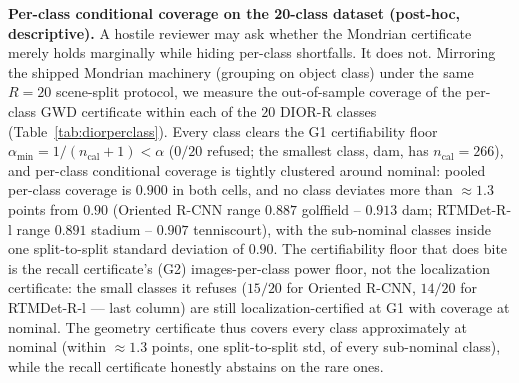 \documentclass[journal]{IEEEtran}
\begin{document}
\textbf{Per-class conditional coverage on the 20-class dataset (post-hoc, descriptive).} A hostile reviewer
may ask whether the Mondrian certificate merely holds marginally while hiding per-class shortfalls. It
does not. Mirroring the shipped Mondrian machinery (grouping on object class) under the same
$R{=}20$ scene-split protocol, we measure the out-of-sample coverage of the per-class GWD certificate
within each of the $20$ DIOR-R classes (Table~\ref{tab:diorperclass}). Every class clears the G1
certifiability floor $\alpha_{\min}{=}1/(n_{\mathrm{cal}}{+}1)\!<\!\alpha$ ($0/20$ refused; the smallest
class, dam, has $n_{\mathrm{cal}}{=}266$), and per-class conditional coverage is tightly clustered around
nominal: pooled per-class coverage is $0.900$ in both cells, and no class deviates more than
$\approx1.3$ points from $0.90$ (Oriented R-CNN range $0.887$ golffield -- $0.913$ dam; RTMDet-R-l range
$0.891$ stadium -- $0.907$ tenniscourt), with the sub-nominal classes inside one split-to-split standard
deviation of $0.90$. The certifiability floor that does bite is the recall certificate's (G2)
images-per-class power floor, not the localization certificate: the small classes it refuses ($15/20$ for
Oriented R-CNN, $14/20$ for RTMDet-R-l --- last column) are still localization-certified at G1 with coverage
at nominal. The geometry certificate thus covers every class approximately at nominal (within
$\approx1.3$ points, one split-to-split std, of every sub-nominal class), while the recall certificate
honestly abstains on the rare ones.
\end{document}
